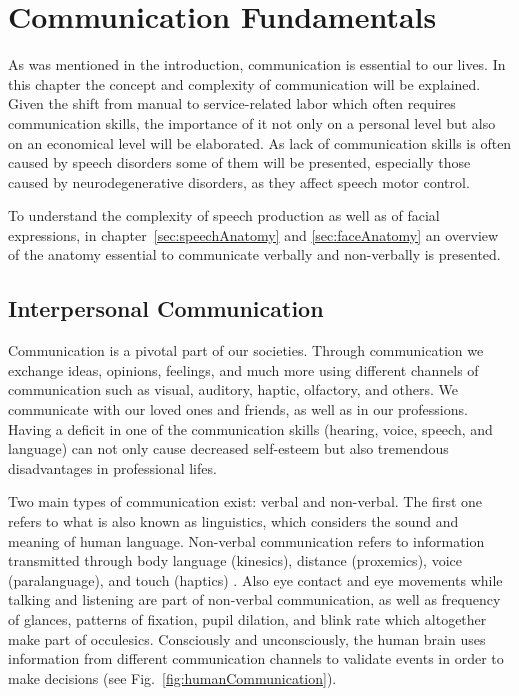 \chapter{Communication Fundamentals}
\label{cha:fundamentals}
\acresetall


As was mentioned in the introduction, communication is essential to our lives. In this chapter the concept and complexity of communication will be explained. Given the shift from manual to service-related labor which often requires communication skills, the importance of it not only on a personal level but also on an economical level will be elaborated. As lack of communication skills is often caused by speech disorders some of them will be presented, especially those caused by neurodegenerative disorders, as they affect speech motor control.

To understand the complexity of speech production as well as of facial expressions, in chapter~\ref{sec:speechAnatomy} and \ref{sec:faceAnatomy} an overview of the anatomy essential to communicate verbally and non-verbally is presented. 



\section{Interpersonal Communication} %
\label{sec:communication}

Communication is a pivotal part of our societies. Through communication we exchange ideas, opinions, feelings, and much more using different channels of communication such as visual, auditory, haptic, olfactory, and others. We communicate with our loved ones and friends, as well as in our professions. Having a deficit in one of the communication skills (hearing, voice, speech, and language) can not only cause decreased self-esteem but also tremendous disadvantages in professional lifes. 

Two main types of communication exist: verbal and non-verbal. The first one refers to what is also known as linguistics, which considers the sound and meaning of human language. Non-verbal communication refers to information transmitted through body language (kinesics), distance (proxemics), voice (paralanguage), and touch (haptics) \cite{Burgoon2016}. Also eye contact and eye movements while talking and listening are part of non-verbal communication, as well as frequency of glances, patterns of fixation, pupil dilation, and blink rate which altogether make part of occulesics. Consciously and unconsciously, the human brain uses information from different communication channels to validate events in order to make decisions (see Fig.~\ref{fig:humanCommunication}).


